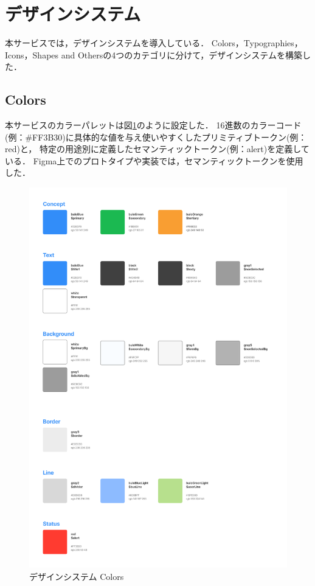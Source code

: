 \section{デザインシステム}
本サービスでは，デザインシステムを導入している．
Colors，Typographies，Icons，Shapes and Othersの4つのカテゴリに分けて，デザインシステムを構築した．
\subsection{Colors}
本サービスのカラーパレットは図\ref{fig:feature_colors}のように設定した．
16進数のカラーコード(例：\#FF3B30)に具体的な値を与え使いやすくしたプリミティブトークン(例：red)と，
特定の用途別に定義したセマンティックトークン(例：alert)を定義している．
Figma上でのプロトタイプや実装では，セマンティックトークンを使用した．
\begin{figure}[H]
    \centering
    \includegraphics[width=12cm]{images/colors.png}
    \caption{デザインシステム Colors}
    \label{fig:feature_colors}
\end{figure}

